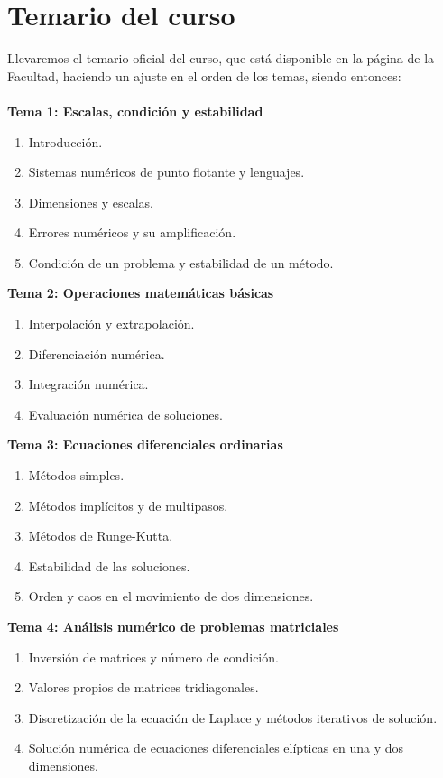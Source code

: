 \documentclass[12pt]{article}
\begin{document}
\section{Temario del curso}
Llevaremos el temario oficial del curso, que est\'{a} disponible en la p\'{a}gina de la Facultad, haciendo un ajuste en el orden de los temas, siendo entonces:
\\
\\  
\textbf{Tema 1: Escalas, condici\'{o}n y estabilidad}
\begin{enumerate}
\item Introducci\'{o}n.
\item Sistemas num\'{e}ricos de punto flotante y lenguajes.
\item Dimensiones y escalas.
\item Errores num\'{e}ricos y su amplificaci\'{o}n.
\item Condici\'{o}n de un problema y estabilidad de un m\'{e}todo.
\end{enumerate}
\textbf{Tema 2: Operaciones matem\'{a}ticas b\'{a}sicas}
\begin{enumerate}
\item Interpolaci\'{o}n y extrapolaci\'{o}n.
\item Diferenciaci\'{o}n num\'{e}rica.
\item Integraci\'{o}n num\'{e}rica.
\item Evaluaci\'{o}n num\'{e}rica de soluciones.
\end{enumerate}
\textbf{Tema 3: Ecuaciones diferenciales ordinarias}
\begin{enumerate}
\item M\'{e}todos simples.
\item M\'{e}todos impl\'{i}citos y de multipasos.
\item M\'{e}todos de Runge-Kutta.
\item Estabilidad de las soluciones.
\item Orden y caos en el movimiento de dos dimensiones.
\end{enumerate}
\textbf{Tema 4: An\'{a}lisis num\'{e}rico de problemas matriciales}
\begin{enumerate}
\item Inversi\'{o}n de matrices y n\'{u}mero de condici\'{o}n.
\item Valores propios de matrices tridiagonales.
\item Discretizaci\'{o}n de la ecuaci\'{o}n de Laplace y m\'{e}todos iterativos de soluci\'{o}n.
\item Solución num\'{e}rica de ecuaciones diferenciales el\'{i}pticas en una y dos dimensiones.
\end{enumerate}
\end{document}
